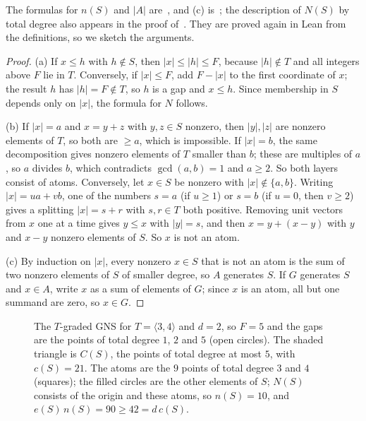 \documentclass[11pt]{article}
\theoremstyle{definition}
\theoremstyle{remark}
\begin{document}
\noindent The formulas for $n(S)$ and $|A|$ are~\cite[Proposition~4.6 and
Corollary~4.7]{cn}, and (c) is~\cite[Theorem~4.3]{cn}; the description of $N(S)$
by total degree also appears in the proof of~\cite[Theorem~5.5]{bcd}. They are
proved again in Lean from the definitions, so we sketch the arguments.

\begin{proof}
(a) If $x\le h$ with $h\notin S$, then $|x|\le|h|\le F$, because $|h|\notin T$
and all integers above $F$ lie in $T$. Conversely, if $|x|\le F$, add $F-|x|$ to
the first coordinate of $x$; the result $h$ has $|h|=F\notin T$, so $h$ is a gap
and $x\le h$. Since membership in $S$ depends only on $|x|$, the formula for
$N$ follows.

(b) If $|x|=a$ and $x=y+z$ with $y,z\in S$ nonzero, then $|y|,|z|$ are nonzero
elements of $T$, so both are $\ge a$, which is impossible. If $|x|=b$, the
same decomposition gives nonzero elements of $T$ smaller than $b$; these are
multiples of $a$, so $a$ divides $b$, which contradicts $\gcd(a,b)=1$ and $a\ge2$. So
both layers consist of atoms. Conversely, let $x\in S$ be nonzero with
$|x|\notin\{a,b\}$. Writing $|x|=ua+vb$, one of the numbers $s=a$ (if $u\ge1$)
or $s=b$ (if $u=0$, then $v\ge2$) gives a splitting $|x|=s+r$ with $s,r\in T$ both
positive. Removing unit vectors from $x$ one at a time gives $y\le x$ with
$|y|=s$, and then $x=y+(x-y)$ with $y$ and $x-y$ nonzero elements of $S$. So $x$
is not an atom.

(c) By induction on $|x|$, every nonzero $x\in S$ that is not an atom is the sum
of two nonzero elements of $S$ of smaller degree, so $A$ generates $S$. If $G$
generates $S$ and $x\in A$, write $x$ as a sum of elements of $G$; since $x$ is
an atom, all but one summand are zero, so $x\in G$.
\end{proof}

\begin{figure}[ht]
\centering
{}
\caption{The $T$-graded GNS for $T=\langle3,4\rangle$ and $d=2$, so $F=5$ and
the gaps are the points of total degree $1$, $2$ and $5$ (open circles). The
shaded triangle is $C(S)$, the points of total degree at most $5$, with
$c(S)=21$. The atoms are the $9$ points of total degree $3$ and $4$ (squares);
the filled circles are the other elements of $S$;
$N(S)$ consists of the origin and these atoms, so $n(S)=10$, and
$e(S)\,n(S)=90\ge42=d\,c(S)$.}
\label{fig:example}
\end{figure}
\end{document}

